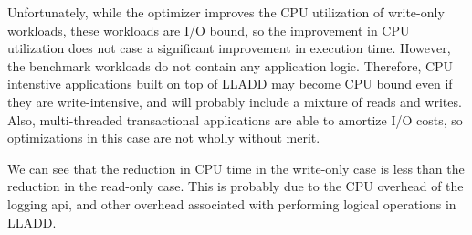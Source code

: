 \documentclass[10pt,letterpaper,twocolumn,english]{article}
\newcommand{\yad}{LLADD\xspace}
\begin{document}
Unfortunately, while the optimizer improves the CPU utilization of
write-only workloads, these workloads are I/O bound, so the
improvement in CPU utilization does not case a significant improvement
in execution time.  However, the benchmark workloads do not contain
any application logic.  Therefore, CPU intenstive applications built
on top of \yad may become CPU bound even if they are write-intensive,
and will probably include a mixture of reads and writes.  Also,
multi-threaded transactional applications are able to amortize I/O
costs, so optimizations in this case are not wholly without merit.

We can see that the reduction in CPU time in the write-only case is
less than the reduction in the read-only case.  This is probably due
to the CPU overhead of the logging api, and other overhead associated
with performing logical operations in \yad. 
\end{document}
